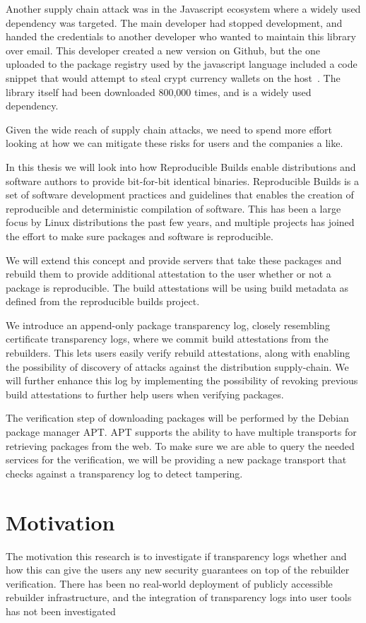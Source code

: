 \documentclass[../Main/thesis.tex]{subfiles}
\begin{document}
Another supply chain attack was in the Javascript ecosystem where a widely used
dependency was targeted. The main developer had stopped development, and handed
the credentials to another developer who wanted to maintain this library over
email. This developer created a new version on Github, but the one uploaded to
the package registry used by the javascript language included a code snippet
that would attempt to steal crypt currency wallets on the
host~\cite{malicious-npm}. The library itself had been downloaded 800,000 times,
and is a widely used dependency.

Given the wide reach of supply chain attacks, we need to spend more effort
looking at how we can mitigate these risks for users and the companies a like.

In this thesis we will look into how Reproducible Builds enable distributions
and software authors to provide bit-for-bit identical binaries. Reproducible
Builds is a set of software development practices and guidelines that enables
the creation of reproducible and deterministic compilation of software. This has
been a large focus by Linux distributions the past few years, and multiple
projects has joined the effort to make sure packages and software is
reproducible.

We will extend this concept and provide servers that take these packages and
rebuild them to provide additional attestation to the user whether or not a
package is reproducible. The build attestations will be using build metadata as
defined from the reproducible builds project.

We introduce an append-only package transparency log, closely resembling
certificate transparency logs, where we commit build attestations from the
rebuilders. This lets users easily verify rebuild attestations, along with
enabling the possibility of discovery of attacks against the distribution
supply-chain. We will further enhance this log by implementing the possibility
of revoking previous build attestations to further help users when verifying
packages.

The verification step of downloading packages will be performed by the Debian
package manager APT. APT supports the ability to have multiple transports for
retrieving packages from the web. To make sure we are able to query the needed
services for the verification, we will be providing a new package transport that
checks against a transparency log to detect tampering.

\section{Motivation}\label{sec:motivation}
The motivation this research is to investigate if transparency logs whether and
how this can give the users any new security guarantees on top of the rebuilder
verification. There has been no real-world deployment of publicly accessible
rebuilder infrastructure, and the integration of transparency logs into user
tools has not been investigated 
\end{document}

